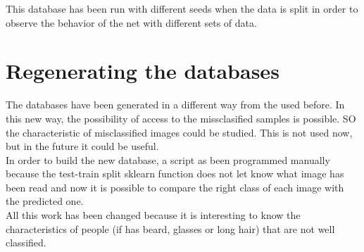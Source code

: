 This database has been run with different seeds when the data is split in order to observe the behavior of the net with different sets of data.\\







\section{Regenerating the databases}
The databases have been generated in a different way from the used before. In this new way, the possibility of access to the missclasified samples is possible. SO the characteristic of misclassified images could be studied. This is not used now, but in the future it could be useful.\\

In order to build the new database, a script as been programmed manually because the test-train split sklearn function does not let know what image has been read and now it is possible to compare the right class of each image with the predicted one.\\

All this work has been changed because it is interesting to know the characteristics of people (if has beard, glasses or long hair) that are not well classified.\\

